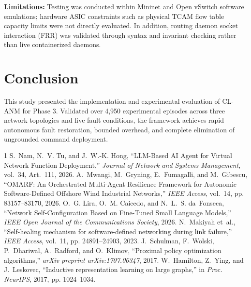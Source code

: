 \documentclass[10pt,twocolumn,a4paper]{article}
\begin{document}
\textbf{Limitations:} Testing was conducted within Mininet and Open vSwitch software emulations; hardware ASIC constraints such as physical TCAM flow table capacity limits were not directly evaluated. In addition, routing daemon socket interaction (FRR) was validated through syntax and invariant checking rather than live containerized daemons.

\section{Conclusion}
This study presented the implementation and experimental evaluation of CL-ANM for Phase 3. Validated over 4,950 experimental episodes across three network topologies and five fault conditions, the framework achieves rapid autonomous fault restoration, bounded overhead, and complete elimination of ungrounded command deployment.


\begin{thebibliography}{1}
S.~Nam, N.~V. Tu, and J.~W.-K. Hong, ``LLM-Based AI Agent for Virtual Network Function Deployment,'' \emph{Journal of Network and Systems Management}, vol.~34, Art.~111, 2026.
A.~Mwangi, M.~Gryning, E.~Fumagalli, and M.~Gibescu, ``OMARF: An Orchestrated Multi-Agent Resilience Framework for Autonomic Software-Defined Offshore Wind Industrial Networks,'' \emph{IEEE Access}, vol.~14, pp. 83157--83170, 2026.
O.~G. Lira, O.~M. Caicedo, and N.~L.~S. da~Fonseca, ``Network Self-Configuration Based on Fine-Tuned Small Language Models,'' \emph{IEEE Open Journal of the Communications Society}, 2026.
N.~Makiyah et~al., ``Self-healing mechanism for software-defined networking during link failure,'' \emph{IEEE Access}, vol.~11, pp. 24891--24903, 2023.
J.~Schulman, F.~Wolski, P.~Dhariwal, A.~Radford, and O.~Klimov, ``Proximal policy optimization algorithms,'' \emph{arXiv preprint arXiv:1707.06347}, 2017.
W.~Hamilton, Z.~Ying, and J.~Leskovec, ``Inductive representation learning on large graphs,'' in \emph{Proc. NeurIPS}, 2017, pp. 1024--1034.
\end{thebibliography}
\end{document}
